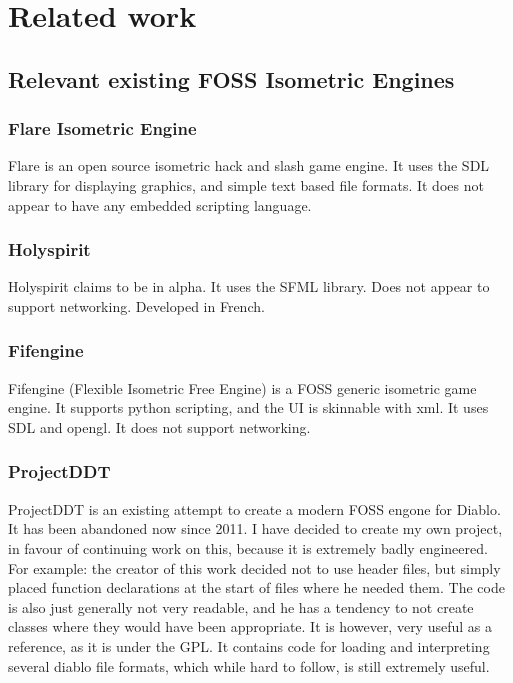 \section{Related work}
    \subsection{Relevant existing FOSS Isometric Engines}
    	\subsubsection{Flare Isometric Engine}
    	Flare\cite{flare} is an open source isometric hack and slash game engine. It uses the SDL library for displaying graphics, and simple text based file formats.
    	It does not appear to have any embedded scripting language.
    	
    	\subsubsection{Holyspirit}
    	Holyspirit\cite{holyspirit} claims to be in alpha. It uses the SFML library. Does not appear to support networking.
    	Developed in French.
    	
    	\subsubsection{Fifengine}
    	Fifengine\cite{fife} (Flexible Isometric Free Engine) is a FOSS generic isometric game engine.
    	It supports python scripting, and the UI is skinnable with xml.
    	It uses SDL and opengl. It does not support networking.
    	
    	\subsubsection{ProjectDDT}
    	ProjectDDT\cite{ddt} is an existing attempt to create a modern FOSS engone for Diablo.
    	It has been abandoned now since 2011.
    	I have decided to create my own project, in favour of continuing work on this, because it is extremely badly engineered.
    	For example: the creator of this work decided not to use header files, but simply placed function declarations at the start of files where he needed them.
    	The code is also just generally not very readable, and he has a tendency to not create classes where they would have been appropriate.
    	It is however, very useful as a reference, as it is under the GPL.
    	It contains code for loading and interpreting several diablo file formats, which while hard to follow, is still extremely useful.